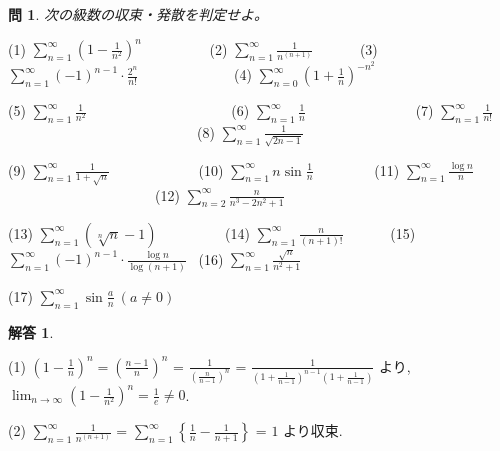 \documentclass{jsarticle}
\newtheorem{question}{問}
\newtheorem*{answer*}{解答}
\begin{document}
\begin{question}
次の級数の収束・発散を判定せよ。
\end{question}

(1) $\displaystyle \sum_{n=1}^{\infty} \left(1-\frac{1}{n^2} \right)^n$
\ \ \ \ \ \ \ \ \  
(2) $\displaystyle \sum_{n=1}^{\infty} \frac{1}{n^(n+1)}$
\ \ \ \ \ \   
(3) $\displaystyle \sum_{n=1}^{\infty} (-1)^{n-1} \cdot \frac{2^n}{n!}$
\ \ \ \ \ \ \ \ \ \ \ \ \ 
(4) $\displaystyle \sum_{n=0}^{\infty} \left(1+\frac{1}{n} \right)^{-n^2}$

\bigskip

(5) $\displaystyle \sum_{n=1}^{\infty} \frac{1}{n^2}$
\ \ \ \ \ \ \ \ \ \ \ \ \ \ \ \ \ \ \ \
(6) $\displaystyle \sum_{n=1}^{\infty} \frac{1}{n}$
\ \ \ \ \ \ \ \ \ \ \ \ \ \ \  
(7) $\displaystyle \sum_{n=1}^{\infty} \frac{1}{n!}$
\ \ \ \ \ \ \ \ \ \ \ \ \ \ \ \ \ \ \ \ \ \ \ \ \ \ \ 
(8) $\displaystyle \sum_{n=1}^{\infty} \frac{1}{\sqrt{2n-1}}$

\bigskip

(9) $\displaystyle \sum_{n=1}^{\infty} \frac{1}{1+\sqrt{n}}$
\ \ \ \ \ \ \ \ \ \ \ \ 
(10) $\displaystyle \sum_{n=1}^{\infty} n\sin \frac{1}{n}$
\ \ \ \ \ \ \ \    
(11) $\displaystyle \sum_{n=1}^{\infty} \frac{\log n}{n}$
\ \ \ \ \ \ \ \ \ \ \ \ \ \ \ \ \ \ \ \ \ 
(12) $\displaystyle \sum_{n=2}^{\infty} \frac{n}{n^3-2n^2+1}$

\bigskip

(13) $\displaystyle \sum_{n=1}^{\infty} (\sqrt[n]{n}-1)$
\ \ \ \ \ \ \ \ \ 
(14) $\displaystyle \sum_{n=1}^{\infty} \frac{n}{(n+1)!}$
\ \ \ \ \ \ 
(15) $\displaystyle \sum_{n=1}^{\infty} (-1)^{n-1} \cdot \frac{\log n}{\log{(n+1)}}$
\ 
(16) $\displaystyle \sum_{n=1}^{\infty} \frac{\sqrt{n}}{n^2+1}$

\bigskip

(17) $\displaystyle \sum_{n=1}^{\infty} \sin{\frac{a}{n}} \ (a \neq 0)$

\bigskip

\begin{answer*}
\end{answer*}

(1) $\displaystyle \left(1-\frac{1}{n} \right)^n = \displaystyle\left(\frac{n-1}{n} \right)^n$ = 
$\displaystyle \frac{1}{\left(\frac{n}{n-1} \right)^n}$ = 
$\displaystyle \frac{1}{\left(1 + \frac{1}{n-1} \right)^{n-1} \left(1 + \frac{1}{n-1} \right)}$
より,
$\displaystyle \lim_{n \to \infty} \left(1-\frac{1}{n^2} \right)^n = \frac{1}{e} \neq 0$.

(2) $\displaystyle \sum_{n=1}^{\infty} \frac{1}{n^(n+1)}$ =
    $\displaystyle \sum_{n=1}^{\infty} \left\{\frac{1}{n}  - \frac{1}{n+1} \right\}$ = $1$ 
    より収束.
\end{document}
